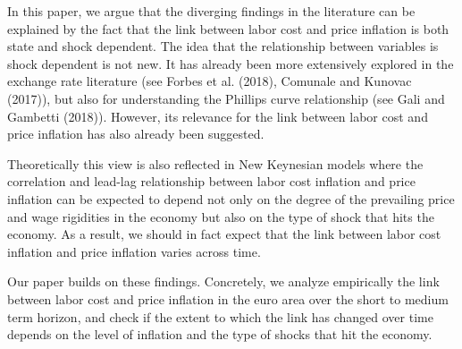 \documentclass[11pt]{article}
\begin{document}
In this paper, we argue that the diverging findings in the literature can be explained by the fact that the link between labor cost and price inflation is both state and shock dependent.  The idea that the relationship between variables is shock dependent is not new. It has already been more extensively explored in the exchange rate literature (see Forbes et al. (2018), Comunale and Kunovac (2017)), but also for understanding the Phillips curve relationship (see Gali and Gambetti (2018)). However, its relevance for the link between labor cost and price inflation has also already been suggested.


Theoretically this view is also reflected in New Keynesian models where the correlation and lead-lag relationship between labor cost inflation and price inflation can be expected to depend not only on the degree of the prevailing price and wage rigidities in the economy but also on the type of shock that hits the economy. As a result, we should in fact expect that the link between labor cost inflation and price inflation varies across time. 


Our paper builds on these findings. Concretely, we analyze empirically the link between labor cost and price inflation in the euro area over the short to medium term horizon, and check if the extent to which the link has changed over time depends on the level of inflation and the type of shocks that hit the economy.
\end{document}
